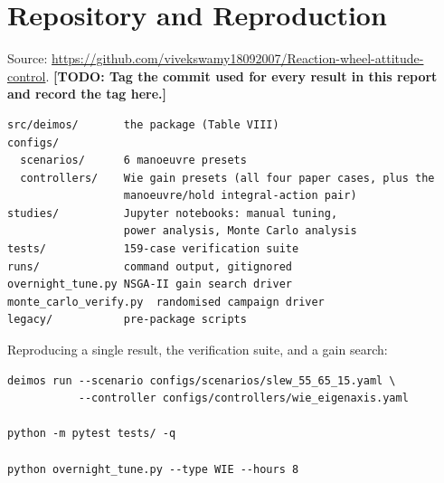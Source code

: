 \documentclass[conference,10pt,a4paper]{IEEEtran}
\newcommand{\TODO}[1]{\textbf{[TODO: #1]}}
\newcommand{\TODO}[1]{}
\begin{document}
\section{Repository and Reproduction}
\label{app:repo}

Source: \url{https://github.com/vivekswamy18092007/Reaction-wheel-attitude-control}.
\TODO{Tag the commit used for every result in this report and record the tag
here.}

\begin{lstlisting}[caption={Repository layout.},captionpos=b]
src/deimos/       the package (Table VIII)
configs/
  scenarios/      6 manoeuvre presets
  controllers/    Wie gain presets (all four paper cases, plus the
                  manoeuvre/hold integral-action pair)
studies/          Jupyter notebooks: manual tuning,
                  power analysis, Monte Carlo analysis
tests/            159-case verification suite
runs/             command output, gitignored
overnight_tune.py NSGA-II gain search driver
monte_carlo_verify.py  randomised campaign driver
legacy/           pre-package scripts
\end{lstlisting}

Reproducing a single result, the verification suite, and a gain search:

\begin{lstlisting}
deimos run --scenario configs/scenarios/slew_55_65_15.yaml \
           --controller configs/controllers/wie_eigenaxis.yaml

python -m pytest tests/ -q

python overnight_tune.py --type WIE --hours 8
\end{lstlisting}
\end{document}
